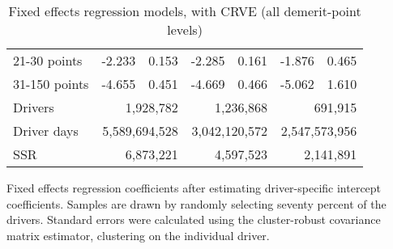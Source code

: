 \begin{table}
\begin{tabular}{l r r r r r r}
21-30 points  & -2.233  &  0.153  & -2.285  &  0.161  & -1.876  &  0.465   \\ 
 
31-150 points  & -4.655  &  0.451  & -4.669  &  0.466  & -5.062  &  1.610   \\ 
 

\hline 
 

Drivers 
 & \multicolumn{2}{r}{1,928,782}  & \multicolumn{2}{r}{1,236,868}  & \multicolumn{2}{r}{691,915}   \\ 
 

Driver days 
 & \multicolumn{2}{r}{5,589,694,528}  & \multicolumn{2}{r}{3,042,120,572}  & \multicolumn{2}{r}{2,547,573,956}   \\ 
 

SSR 
 & \multicolumn{2}{r}{6,873,221}  & \multicolumn{2}{r}{4,597,523}  & \multicolumn{2}{r}{2,141,891}   \\ 
 

\hline 
 
\end{tabular} 
\caption{Fixed effects regression models, with CRVE (all demerit-point levels)} 
Fixed effects regression coefficients after estimating driver-specific intercept coefficients. 
Samples are drawn by randomly selecting seventy percent of the drivers. 
Standard errors were calculated using the cluster-robust covariance matrix estimator, 
clustering on the individual driver. 
\label{tab:FE_regs_CRVE_all_pts} 
\end{table} 
 
